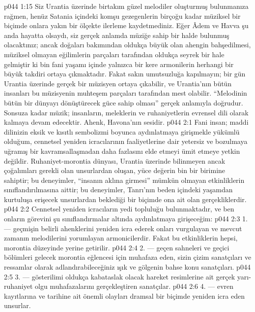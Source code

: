 \vs p044 1:15 Siz Urantia üzerinde birtakım güzel melodiler oluşturmuş bulunmanıza rağmen, henüz Satania içindeki komşu gezegenlerin birçoğu kadar müziksel bir biçimde onlara yakın bir ölçekte ilerleme kaydetmediniz. Eğer Âdem ve Havva şu anda hayatta olsaydı, siz gerçek anlamda müziğe sahip bir halde bulunmuş olacaktınız; ancak doğaları bakımından oldukça büyük olan ahengin bahşedilmesi, müziksel olmayan eğilimlerin parçaları tarafından oldukça seyrek bir hale gelmiştir ki bin fani yaşamı içinde yalnızca bir kere armonilerin herhangi bir büyük takdiri ortaya çıkmaktadır. Fakat sakın umutsuzluğa kapılmayın; bir gün Urantia üzerinde gerçek bir müzisyen ortaya çıkabilir, ve Urantia’nın bütün insanları bu müzisyenin muhteşem parçaları tarafından mest olabilir. “Melodinin bütün bir dünyayı dönüştürecek güce sahip olması” gerçek anlamıyla doğrudur. Sonsuza kadar müzik; insanların, meleklerin ve ruhaniyetlerin evrensel dili olarak kalmaya devam edecektir. Ahenk, Havona’nın sesidir.
\vs p044 2:1 Fani insan; maddi dilinizin eksik ve kısıtlı sembolizmi boyunca aydınlatmaya girişmekle yükümlü olduğum, cennetsel yeniden icracılarının faaliyetlerine dair yetersiz ve bozulmaya uğramış bir kavramsallaşmadan daha fazlasını elde etmeyi ümit etmeye yetkin değildir. Ruhaniyet\hyp{}morontia dünyası, Urantia üzerinde bilinmeyen ancak çoğalımları gerekli olan unsurlardan oluşan, yüce değerin bin bir birimine sahiptir; bu deneyimler, “insanın aklına girmesi” mümkün olmayan etkinliklerin sınıflandırılmasına aittir; bu deneyimler, Tanrı’nın beden içindeki yaşamdan kurtuluşa erişecek unsurlardan beklediği bir biçimde ona ait olan gerçekliklerdir.
\vs p044 2:2 Cennetsel yeniden icracıların yedi topluluğu bulunmaktadır, ve ben onların görevini şu sınıflandırmalar altında aydınlatmaya girişeceğim:
\vs p044 2:3 1.\bibnobreakspace {} --- geçmişin belirli ahenklerini yeniden icra ederek onları vurgulayan ve mevcut zamanın melodilerini yorumlayan armonicilerdir. Fakat bu etkinliklerin hepsi, morontia düzeyinde yerine getirilir.
\vs p044 2:4 2.\bibnobreakspace {} --- geçen sahneleri ve geçici bölümleri gelecek morontia eğlencesi için muhafaza eden, sizin çizim sanatçıları ve ressamlar olarak adlandırabileceğiniz ışık ve gölgenin bahse konu sanatçıları.
\vs p044 2:5 3.\bibnobreakspace {} --- gösterilimi oldukça kabataslak olacak hareket resimlerine ait gerçek yarı\hyp{}ruhaniyet olgu muhafazalarını gerçekleştiren sanatçılar.
\vs p044 2:6 4.\bibnobreakspace {} --- evren kayıtlarına ve tarihine ait önemli olayları dramsal bir biçimde yeniden icra eden unsurlar.
